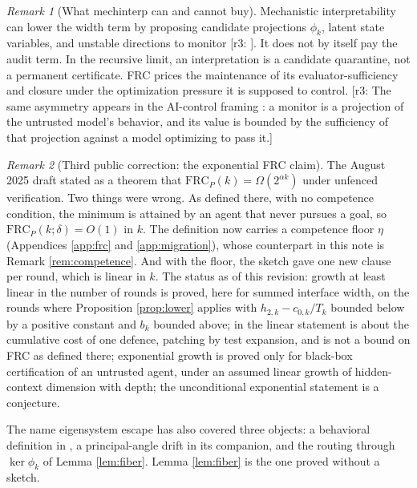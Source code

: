 \documentclass[11pt]{article}
\theoremstyle{definition}
\theoremstyle{remark}
\newtheorem{remark}{Remark}[section]
\newcommand{\revnote}[1]{\textcolor{red!60!black}{[r3: #1]}}
\begin{document}
\begin{remark}[What mechinterp can and cannot buy]
Mechanistic interpretability can lower the width term by proposing candidate projections $\phi_k$, latent state variables, and unstable directions to monitor \revnote{\cite{cunningham2023,bricken2023,sharkey2025}}. It does not by itself pay the audit term. In the recursive limit, an interpretation is a candidate quarantine, not a permanent certificate. FRC prices the maintenance of its evaluator-sufficiency and closure under the optimization pressure it is supposed to control. \revnote{The same asymmetry appears in the AI-control framing \cite{greenblatt2023}: a monitor is a projection of the untrusted model's behavior, and its value is bounded by the sufficiency of that projection against a model optimizing to pass it.}
\end{remark}

\begin{remark}[Third public correction: the exponential FRC claim]\label{rem:third}
The August 2025 draft \cite{dugan2025frc} stated as a theorem that $\mathrm{FRC}_P(k)=\Omega(2^{\alpha k})$ under unfenced verification. Two things were wrong. As defined there, with no competence condition, the minimum is attained by an agent that never pursues a goal, so $\mathrm{FRC}_P(k;\delta)=O(1)$ in $k$. The definition now carries a competence floor $\eta$ (Appendices \ref{app:frc} and \ref{app:migration}), whose counterpart in this note is Remark \ref{rem:competence}. And with the floor, the sketch gave one new clause per round, which is linear in $k$. The status as of this revision: growth at least linear in the number of rounds is proved, here for summed interface width, on the rounds where Proposition \ref{prop:lower} applies with $h_{2,k}-c_{0,k}/T_k$ bounded below by a positive constant and $b_k$ bounded above; in \cite{dugan2025frc} the linear statement is about the cumulative cost of one defence, patching by test expansion, and is not a bound on FRC as defined there; exponential growth is proved only for black-box certification of an untrusted agent, under an assumed linear growth of hidden-context dimension with depth; the unconditional exponential statement is a conjecture.

The name eigensystem escape has also covered three objects: a behavioral definition in \cite{dugan2025frc}, a principal-angle drift in its companion, and the routing through $\ker\phi_k$ of Lemma \ref{lem:fiber}. Lemma \ref{lem:fiber} is the one proved without a sketch.
\end{remark}
\end{document}
